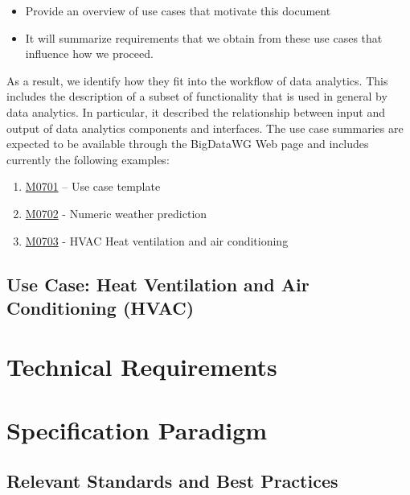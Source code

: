 \documentclass[12pt]{article}
\begin{document}
\begin{itemize}
\item	Provide an overview of use cases that motivate this document
\item	It will summarize requirements that we obtain from these use cases that influence how we proceed.
\end{itemize}

As a result, we identify how they fit into the workflow of data analytics. This includes the description of a subset of functionality that is used in general by data analytics.  In particular, it described the relationship between input and output of data analytics components and interfaces.  The use case summaries are expected to be available through the BigDataWG Web page and includes currently the following examples:

\begin{enumerate}
\item	\href{https://bigdatawg.nist.gov/_uploadfiles/M0701_v1_2020102001.docx}{M0701} – Use case template
\item	\href{https://bigdatawg.nist.gov/_uploadfiles/M0702_v1_2020102002.pdf}{M0702} - Numeric weather prediction
\item	\href{https://bigdatawg.nist.gov/_uploadfiles/M0703_v1_2020102003.pdf}{M0703} - HVAC Heat ventilation and air conditioning 
\end{enumerate}






\clearpage

\subsection{Use Case: Heat Ventilation and Air Conditioning (HVAC)}


\section{Technical Requirements}

\section{Specification Paradigm}

\subsection{Relevant Standards and Best Practices}
\end{document}
